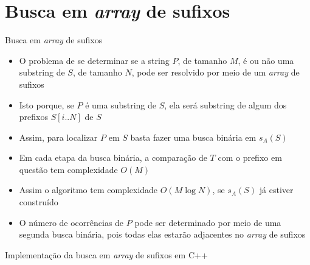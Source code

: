 \section{Busca em {\it array} de sufixos}

\begin{frame}[fragile]{Busca em {\it array} de sufixos}

    \begin{itemize}
        \item O problema de se determinar se a string $P$, de tamanho $M$, é ou não uma substring 
            de $S$, de tamanho $N$, pode ser
            resolvido por meio de um {\it array} de sufixos

        \item Isto porque, se $P$ é uma substring de $S$, ela será substring de algum dos
            prefixos $S[i..N]$ de $S$

        \item Assim, para localizar $P$ em $S$ basta fazer uma busca binária em $s_A(S)$

        \item Em cada etapa da busca binária, a comparação de $T$ com o prefixo em questão
            tem complexidade $O(M)$

        \item Assim o algoritmo tem complexidade $O(M\log N)$, se $s_A(S)$ já estiver construído

        \item O número de ocorrências de $P$ pode ser determinado por meio de uma segunda
            busca binária, pois todas elas estarão adjacentes no {\it array} de sufixos
    \end{itemize}

\end{frame}

\begin{frame}[fragile]{Implementação da busca em {\it array} de sufixos em C++} 
\end{frame}
